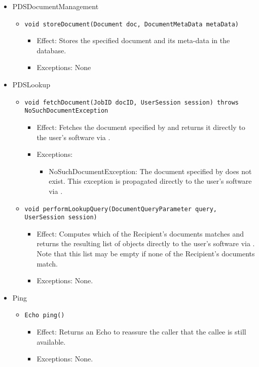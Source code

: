 \begin{itemize}
	\item PDSDocumentManagement
	\begin{itemize}
		\item \texttt{void storeDocument(Document doc, DocumentMetaData metaData)}
		\begin{itemize}
			\item Effect: Stores the specified document and its meta-data in the database.
			\item Exceptions: None
		\end{itemize}
	\end{itemize}

    \item PDSLookup
	\begin{itemize}
		\item \texttt{void fetchDocument(JobID docID, UserSession session) throws NoSuchDocumentException}
		\begin{itemize}
			\item Effect: Fetches the document specified by  and returns it directly to the user's software via .
			\item Exceptions:
			\begin{itemize}
				\item NoSuchDocumentException: The document specified by  does not exist. This exception is propagated directly to the user's software via .
			\end{itemize}
		\end{itemize}
				
		\item \texttt{void performLookupQuery(DocumentQueryParameter query, UserSession session)}
		\begin{itemize}
			\item Effect: Computes which of the Recipient's documents matches  and returns the resulting list of  objects directly to the user's software via . Note that this list may be empty if none of the Recipient's documents match.
			\item Exceptions: None.
		\end{itemize}
	\end{itemize}

	\item Ping
	\begin{itemize}
		\item \texttt{Echo ping()}
		\begin{itemize}
			\item Effect: Returns an Echo to reassure the caller that the callee is still available.
			\item Exceptions: None.
		\end{itemize}
	\end{itemize}
\end{itemize}

